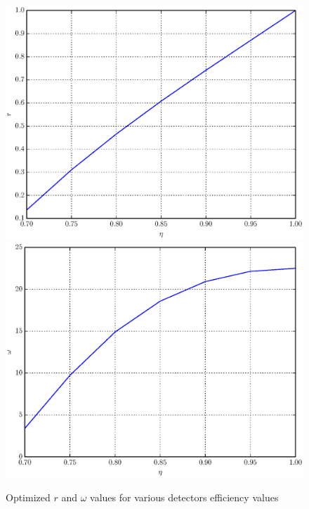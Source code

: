 \documentclass[11pt]{article}
\begin{document}
\begin{figure}[h]
\includegraphics[scale=0.7]{r.eps}
\includegraphics[scale=0.7]{omega.eps}
\caption{Optimized $r$ and $\omega$ values for various detectors efficiency values}
\label{fig:psi_opt}
\end{figure}
\end{document}
